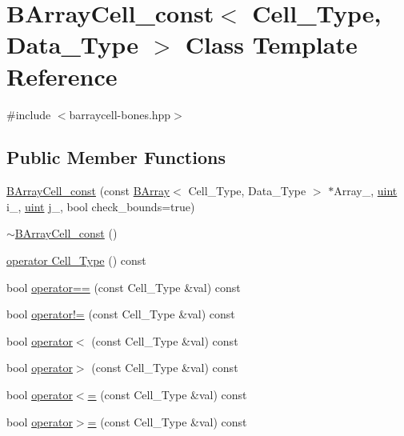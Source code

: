 \hypertarget{class_b_array_cell__const}{}\section{B\+Array\+Cell\+\_\+const$<$ Cell\+\_\+\+Type, Data\+\_\+\+Type $>$ Class Template Reference}
\label{class_b_array_cell__const}


{\ttfamily \#include $<$barraycell-\/bones.\+hpp$>$}

\subsection*{Public Member Functions}
\begin{DoxyCompactItemize}
\item 
\hyperlink{class_b_array_cell__const_a761f21bdc663adbdaf027c1fe7da6424}{B\+Array\+Cell\+\_\+const} (const \hyperlink{class_b_array}{B\+Array}$<$ Cell\+\_\+\+Type, Data\+\_\+\+Type $>$ $\ast$Array\+\_\+, \hyperlink{typedefs_8hpp_a91ad9478d81a7aaf2593e8d9c3d06a14}{uint} i\+\_\+, \hyperlink{typedefs_8hpp_a91ad9478d81a7aaf2593e8d9c3d06a14}{uint} j\+\_\+, bool check\+\_\+bounds=true)
\item 
\hyperlink{class_b_array_cell__const_a3afb7b09142e1c02c9711d601f532573}{$\sim$\+B\+Array\+Cell\+\_\+const} ()
\item 
\hyperlink{class_b_array_cell__const_ab5d767055c53b7024380a8011dad698a}{operator Cell\+\_\+\+Type} () const
\item 
bool \hyperlink{class_b_array_cell__const_a267ac042fc28e411ca553f6f61cbe9b3}{operator==} (const Cell\+\_\+\+Type \&val) const
\item 
bool \hyperlink{class_b_array_cell__const_a967bb71b2c9efefd1970959e1d498089}{operator!=} (const Cell\+\_\+\+Type \&val) const
\item 
bool \hyperlink{class_b_array_cell__const_a93af7c10baa4961aa71350180e579459}{operator$<$} (const Cell\+\_\+\+Type \&val) const
\item 
bool \hyperlink{class_b_array_cell__const_a2cf1300cf2b4670fe735e718482f5791}{operator$>$} (const Cell\+\_\+\+Type \&val) const
\item 
bool \hyperlink{class_b_array_cell__const_a4221856ab5a0b1e149a99e776eee4614}{operator$<$=} (const Cell\+\_\+\+Type \&val) const
\item 
bool \hyperlink{class_b_array_cell__const_af402da27396466b677cf4bcce94af6ed}{operator$>$=} (const Cell\+\_\+\+Type \&val) const
\end{DoxyCompactItemize}


